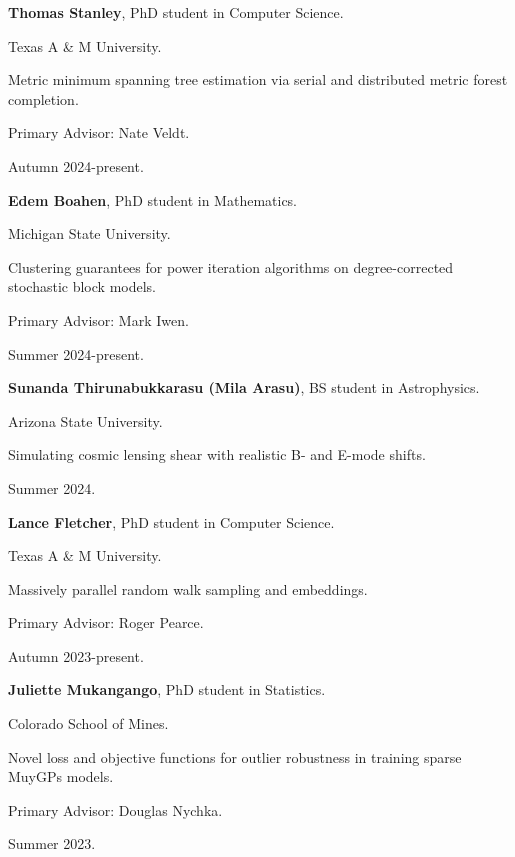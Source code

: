 \begin{innerlist}
  \item[] \textbf{Thomas Stanley},
  PhD student in Computer Science.
  \begin{innerlist}
    \item[-] Texas A \& M University.
    \item[-] Metric minimum spanning tree estimation via serial and distributed metric forest completion.
    \item[-] Primary Advisor: Nate Veldt.
    \item[-] Autumn 2024-present.
  \end{innerlist}
  
  \item[] \textbf{Edem Boahen},
  PhD student in Mathematics.
  \begin{innerlist}
    \item[-] Michigan State University.
    \item[-] Clustering guarantees for power iteration algorithms on degree-corrected stochastic block models.
    \item[-] Primary Advisor: Mark Iwen.
    \item[-] Summer 2024-present.
  \end{innerlist}
  
  \item[] \textbf{Sunanda Thirunabukkarasu (Mila Arasu)},
  BS student in Astrophysics.
  \begin{innerlist}
    \item[-] Arizona State University.
    \item[-] Simulating cosmic lensing shear with realistic B- and E-mode shifts.
    \item[-] Summer 2024.
  \end{innerlist}

  \item[] \textbf{Lance Fletcher},
  PhD student in Computer Science.
  \begin{innerlist}
    \item[-] Texas A \& M University.
    \item[-] Massively parallel random walk sampling and embeddings.
    \item[-] Primary Advisor: Roger Pearce.
    \item[-] Autumn 2023-present.
  \end{innerlist}

  \item[] \textbf{Juliette Mukangango},
  PhD student in Statistics.
  \begin{innerlist}
    \item[-] Colorado School of Mines.
    \item[-] Novel loss and objective functions for outlier robustness in training sparse MuyGPs models.
    \item[-] Primary Advisor: Douglas Nychka.
    \item[-] Summer 2023.
  \end{innerlist}


\end{innerlist}

